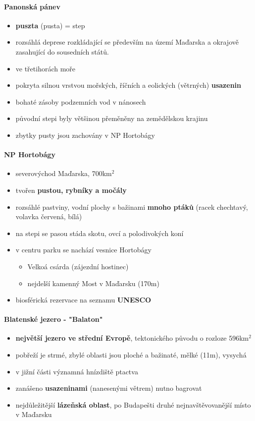 \paragraph{Panonská pánev}
\begin{itemize}
\item \textbf{puszta} (pusta) = step
\item rozsáhlá deprese rozkládající se především na území Maďarska a okrajově zasahující do sousedních států.
\item ve třetihorách moře
\item pokryta silnou vrstvou mořských, říčních a eolických (větrných) \textbf{usazenin}
\item bohaté zásoby podzemních vod v nánosech
\item původní stepi byly většinou přeměněny na zemědělskou krajinu
\item zbytky pusty jsou zachovány v NP Hortobágy
\end{itemize}

\paragraph{NP Hortobágy}
\begin{itemize}
\item severovýchod Maďarska, 700km$^2$
\item tvořen \textbf{pustou, rybníky a močály}
\item rozsáhlé pastviny, vodní plochy s bažinami \ra \textbf{mnoho ptáků} (racek chechtavý, volavka červená, bílá)
\item na stepi se pasou stáda skotu, ovcí a polodivokých koní
\item v centru parku se nachází vesnice Hortobágy
	\begin{itemize}
	\item Velkoá csárda (zájezdní hostinec)
	\item nejdelší kamenný Most v Maďarsku (170m)
	\end{itemize}
\item biosférická rezervace na seznamu \textbf{UNESCO}
\end{itemize}

\paragraph{Blatenské jezero - "Balaton"}
\begin{itemize}
\item \textbf{největší jezero ve střední Evropě}, tektonického původu o rozloze 596km$^2$
\item pobřeží je strmé, zbylé oblasti jsou ploché a bažinaté, mělké (11m), vysychá
\item v jižní části významná hnízdiště ptactva
\item zanášeno \textbf{usazeninami} (nanesenými větrem) \ra nutno bagrovat
\item nejdůležitější \textbf{lázeňská oblast}, po Budapešti druhé nejnavštěvovanější místo v Maďarsku
\end{itemize}

